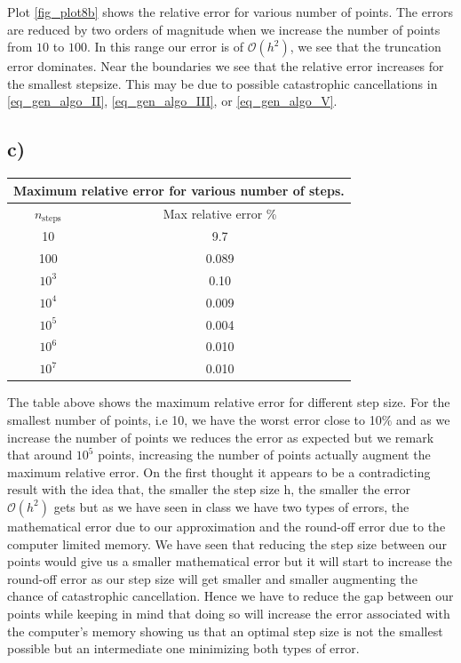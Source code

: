 \documentclass[a4paper,10pt,english]{article}
\begin{document}
			Plot \ref{fig_plot8b} shows the relative error for various number of points. The errors are reduced by two
			orders of magnitude when we increase the number of points from $10$ to $100$. In this range our error
			is of $\mathcal{O}(h^2)$, we see that the truncation error dominates. Near the boundaries we see that the
			relative error increases for the smallest stepsize. This may be due to possible catastrophic cancellations
			in \ref{eq_gen_algo_II},  \ref{eq_gen_algo_III}, or  \ref{eq_gen_algo_V}.
			
			\subsection{c)}
			\begin{tabular}{ |c||c|}
				\hline
				\multicolumn{2}{|c|}{Maximum relative error for various number of steps.} \\
				\hline
				$n_{\text{steps}}$ & Max relative error \% \\
				\hline
				10 & 9.7 \\
				100 & 0.089 \\
				$10^3$ & 0.10 \\
				$10^4$ & 0.009 \\
				$10^5$ & 0.004 \\
				$10^6$ & 0.010 \\
				$10^7$ & 0.010 \\
				\hline
			\end{tabular}
			
			
			The table above shows the maximum relative error for different step size. For the smallest number of points, i.e 10, we have the worst error close to 10$\%$ and as we increase the number of points we reduces the error as expected but we remark that around $10^5$ points, increasing the number of points actually augment the maximum relative error. On the first thought it appears to be a contradicting result with the idea that, the smaller the step size h, the smaller the error $\mathcal{O}(h^2)$ gets but as we have seen in class we have two types of errors, the mathematical error due to our approximation and the round-off error due to the computer limited memory. We have seen that reducing the step size between our points would give us a smaller mathematical error but it will start to increase the round-off error as our step size will get smaller and smaller augmenting the chance of catastrophic cancellation. Hence we have to reduce the gap between our points while keeping in mind that doing so will increase the error associated with the computer's memory showing us that an optimal step size is not the smallest possible but an intermediate one minimizing both types of error.  
			
\end{document}
